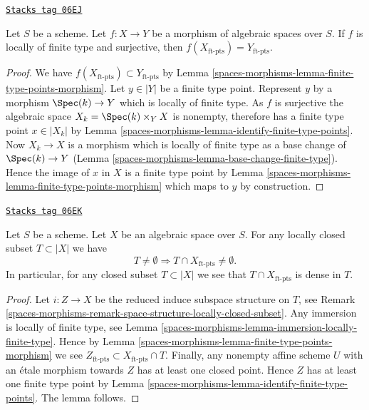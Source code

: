\begin{lemma}
\label{spaces-morphisms-lemma-finite-type-points-surjective-morphism}
\href{https://stacks.math.columbia.edu/tag/06EJ}{\texttt{Stacks tag 06EJ}}

Let $S$ be a scheme.
Let $f : X \to Y$ be a morphism of algebraic spaces over $S$.
If $f$ is locally of finite type and surjective, then
$f(X_{\text{ft-pts}}) = Y_{\text{ft-pts}}$.
\end{lemma}

\begin{proof}
We have $f(X_{\text{ft-pts}}) \subset Y_{\text{ft-pts}}$ by
Lemma \ref{spaces-morphisms-lemma-finite-type-points-morphism}.
Let $y \in |Y|$ be a finite type point. Represent $y$ by a morphism
$\Spec(k) \to Y$ which is locally of finite type.
As $f$ is surjective the algebraic space
$X_k = \Spec(k) \times_Y X$ is nonempty, therefore
has a finite type point $x \in |X_k|$ by
Lemma \ref{spaces-morphisms-lemma-identify-finite-type-points}.
Now $X_k \to X$ is a morphism which is locally of finite type as a base change
of $\Spec(k) \to Y$
(Lemma \ref{spaces-morphisms-lemma-base-change-finite-type}).
Hence the image of $x$ in $X$ is a finite type point by
Lemma \ref{spaces-morphisms-lemma-finite-type-points-morphism}
which maps to $y$ by construction.
\end{proof}

\begin{lemma}
\label{spaces-morphisms-lemma-enough-finite-type-points}
\href{https://stacks.math.columbia.edu/tag/06EK}{\texttt{Stacks tag 06EK}}

Let $S$ be a scheme. Let $X$ be an algebraic space over $S$.
For any locally closed subset $T \subset |X|$ we have
$$
T \not = \emptyset
\Rightarrow
T \cap X_{\text{ft-pts}} \not = \emptyset.
$$
In particular, for any closed subset $T \subset |X|$ we
see that $T \cap X_{\text{ft-pts}}$ is dense in $T$.
\end{lemma}

\begin{proof}
Let $i : Z \to X$ be the reduced induce subspace structure on $T$, see
Remark \ref{spaces-morphisms-remark-space-structure-locally-closed-subset}.
Any immersion is locally of finite type, see
Lemma \ref{spaces-morphisms-lemma-immersion-locally-finite-type}.
Hence by
Lemma \ref{spaces-morphisms-lemma-finite-type-points-morphism}
we see $Z_{\text{ft-pts}} \subset X_{\text{ft-pts}} \cap T$.
Finally, any nonempty affine scheme $U$ with an \'etale morphism towards
$Z$ has at least one closed point. Hence $Z$ has at least one
finite type point by
Lemma \ref{spaces-morphisms-lemma-identify-finite-type-points}.
The lemma follows.
\end{proof}

